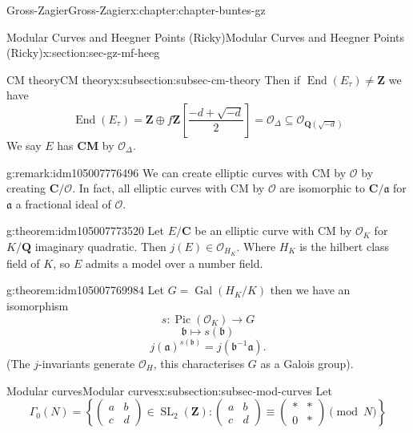 \documentclass[oneside,10pt,]{book}
\newcommand{\terminology}[1]{\textbf{#1}}
\numberwithin{equation}{section}
\newcommand{\ideal}[1]{\mathfrak{#1}}
\newcommand{\inv}{^{-1}}
\newcommand{\lb}{[}
\newcommand{\rb}{]}
\newcommand{\ZZ}{\mathbf{Z}}
\newcommand{\QQ}{\mathbf{Q}}
\newcommand{\CC}{\mathbf{C}}
\newcommand{\ints}{\mathcal{O}}
\DeclareMathOperator{\End}{End}
\DeclareMathOperator{\Pic}{Pic}
\newcommand{\Gal}[2]{\operatorname{Gal}(#1/#2)}
\DeclareMathOperator{\SL}{SL}
\newcommand{\amp}{&}
\begin{document}
\begin{chapterptx}{Gross-Zagier}{}{Gross-Zagier}{}{}{x:chapter:chapter-buntes-gz}
\begin{sectionptx}{Modular Curves and Heegner Points (Ricky)}{}{Modular Curves and Heegner Points (Ricky)}{}{}{x:section:sec-gz-mf-heeg}
\begin{subsectionptx}{CM theory}{}{CM theory}{}{}{x:subsection:subsec-cm-theory}
Then if \(\End(E_\tau ) \ne \ZZ\) we have%
\begin{equation*}
\End(E_\tau ) = \ZZ \oplus f \ZZ \left\lb \frac {-d + \sqrt{-d}}{2} \right \rb = \ints_\Delta  \subseteq \ints_{\QQ(\sqrt{-d})}
\end{equation*}
We say \(E\) has \terminology{CM} by \(\ints_\Delta \).%
\begin{remark}{}{g:remark:idm105007776496}%
We can create elliptic curves with CM by \(\ints\) by creating \(\CC/\ints\). In fact, all elliptic curves with  CM by \(\ints\) are isomorphic to \(\CC/\ideal a\) for \(\ideal a\) a fractional ideal of \(\ints\).%
\end{remark}
\begin{theorem}{}{}{g:theorem:idm105007773520}%
Let \(E/\CC\) be an elliptic curve with CM by \(\ints_K\) for \(K/\QQ\) imaginary quadratic. Then \(j(E) \in \ints_{H_K}\). Where \(H_K\) is the hilbert class field of \(K\), so \(E\) admits a model over a number field.%
\end{theorem}
\begin{theorem}{}{}{g:theorem:idm105007769984}%
Let \(G = \Gal{H_K}{K}\) then we have an isomorphism%
\begin{equation*}
s\colon  \Pic(\ints_K) \to G
\end{equation*}
%
\begin{equation*}
\ideal b\mapsto s(\ideal b)
\end{equation*}
%
\begin{equation*}
j(\ideal a)^{s(\ideal b)} = j(\ideal b \inv \ideal a)\text{.}
\end{equation*}
(The \(j\)-invariants generate \(\ints_H\), this characterises \(G\) as a Galois group).%
\end{theorem}
\end{subsectionptx}
%
%
\typeout{************************************************}
\typeout{************************************************}
%
\begin{subsectionptx}{Modular curves}{}{Modular curves}{}{}{x:subsection:subsec-mod-curves}
Let%
\begin{equation*}
\Gamma_0 (N) = \left\{\begin{pmatrix} a \amp b \\ c \amp d \end{pmatrix}\in \SL_2(\ZZ) : \begin{pmatrix} a \amp b \\ c \amp d \end{pmatrix} \equiv \begin{pmatrix} \ast \amp \ast \\ 0 \amp \ast \end{pmatrix} \pmod N\right\}

\end{equation*}
\end{subsectionptx}
\end{sectionptx}
\end{chapterptx}
\end{document}
